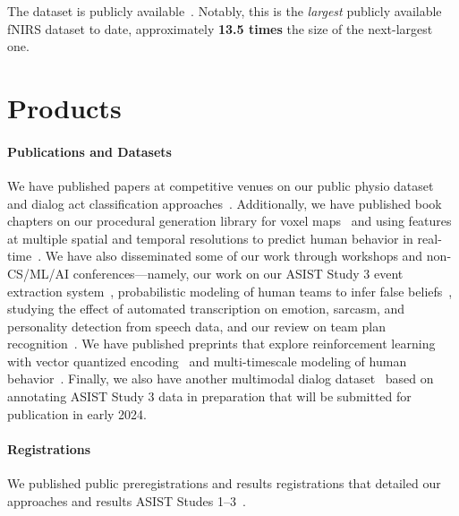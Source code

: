\documentclass[11pt,article,oneside]{memoir}
\begin{document}
The dataset is publicly available~\citep{pyarelal2023the}. Notably, this is
the \emph{largest} publicly available fNIRS dataset to date, approximately
\textbf{13.5 times} the size of the next-largest one.



\section{Products}

\paragraph{Publications and Datasets} We have published papers at competitive
venues on our public physio dataset~\citep{pyarelal2023the} and dialog act
classification approaches~\citep{qamar-etal-2023-speaking,
miah-etal-2023-hierarchical}.  Additionally, we have published book chapters on
our procedural generation library for voxel maps~\citep{Pyarelal.ea:2022} and
using features at multiple spatial and temporal resolutions to predict human
behavior in real-time~\citep{Zhang.ea:2022c}. We have also disseminated some of
our work through workshops and non-CS/ML/AI conferences---namely, our work on
our ASIST Study 3 event extraction system~\citep{nitschke-etal-2022-rule},
probabilistic modeling of human teams to infer false
beliefs~\citep{Soares.ea:2021}, studying the effect of automated transcription
on emotion, sarcasm, and personality detection from speech data, and our review
on team plan recognition~\citep{Rieffer_Champlin_2023}.  We have published
preprints that explore reinforcement learning with vector quantized
encoding~\citep{Zhang.ea:2022a} and multi-timescale modeling of human
behavior~\citep{Basavaraj.ea:2022}. Finally, we also have another multimodal
dialog dataset~\citep{multicat} based on annotating ASIST Study 3 data in
preparation that will be submitted for publication in early 2024.

\paragraph{Registrations} We published public preregistrations and results
registrations that detailed our approaches and results ASIST Studes
1--3~\citep{study_1_preregistration_and_results, study_2_preregistration,
    study_2_results, study_3_preregistration, study_3_results}.
\end{document}
